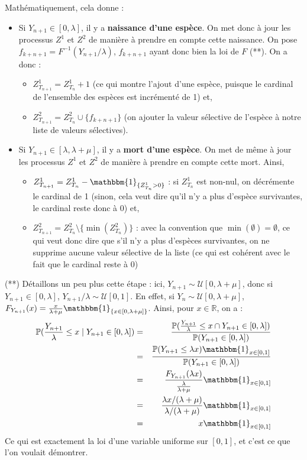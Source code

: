 \documentclass[12pt,a4paper]{article}
\begin{document}
Mathématiquement, cela donne : 
\begin{itemize}
    \item Si $Y_{n+1} \in [0, \lambda]$, il y a \textbf{naissance d'une espèce}. On met donc à jour les processus $Z^1$ et $Z^2$ de manière à prendre en compte cette naissance. On pose $f_{k+n+1} = F^{-1}(Y_{n+1}/\lambda)$, $f_{k+n+1}$ ayant donc bien la loi de $F$ (**). On a donc :
    \begin{itemize}
        \item $Z_{T_{n+1}}^1 = Z_{T_{n}}^1 + 1$ (ce qui montre l'ajout d'une espèce, puisque le cardinal de l'ensemble des espèces est incrémenté de 1) et,
        \item $Z_{{T_{n+1}}}^2 = Z_{T_n}^2 \cup \{f_{k+n+1}\}$ (on ajouter la valeur sélective de l'espèce à notre liste de valeurs sélectives).
    \end{itemize} 
    
    \item Si $Y_{n+1} \in [\lambda, \lambda+\mu]$, il y a \textbf{mort d'une espèce}. On met de même à jour les processus $Z^1$ et $Z^2$ de manière à prendre en compte cette mort. Ainsi, \begin{itemize}
        \item $Z_{T_{n+1}}^1 = Z_{T_n}^1 - \mathbbm{1}_{\{Z_{T_n}^1 > 0 \}}$ : si $Z_{T_n}^1$ est non-nul, on décrémente le cardinal de 1 (sinon, cela veut dire qu'il n'y a plus d'espèce survivantes, le cardinal reste donc à 0) et,
        \item $Z_{T_{n+1}}^2 = Z_{T_n}^2 \setminus \{\min(Z_{T_n}^2)\}$ : avec la convention que $\min (\emptyset ) = \emptyset$, ce qui veut donc dire que s'il n'y a plus d'espèces survivantes, on ne supprime aucune valeur sélective de la liste (ce qui est cohérent avec le fait que le cardinal reste à $0$)
    \end{itemize} 
\end{itemize}

(**) Détaillons un peu plus cette étape : ici, $Y_{n+1} \sim \mathcal{U}[0,\lambda + \mu]$, donc si $Y_{n+1} \in [0, \lambda]$, $Y_{n+1}/\lambda \sim \mathcal{U}[0,1]$.
En effet, si $Y_n \sim \mathcal{U}[0,\lambda+\mu]$, $F_{Y_{n+1}}(x) = \frac{x}{\lambda+\mu} \mathbbm{1}_{\{x \in [0,\lambda + \mu]\}}$. Ainsi, pour $x \in \mathbb{R}$, on a : 
\begin{eqnarray*}
    \mathbb{P}(\frac{Y_{n+1}}{\lambda} \leq x \mid Y_{n+1} \in [0, \lambda]) & = & \frac{\mathbb{P}(\frac{Y_{n+1}}{\lambda} \leq x \cap Y_{n+1} \in [0, \lambda])}{\mathbb{P}(Y_{n+1} \in [0, \lambda])} \\
    & = & \frac{\mathbb{P}(Y_{n+1} \leq \lambda x)\mathbbm{1}_{x\in [0,1]}}{\mathbb{P}(Y_{n+1} \in [0, \lambda])} \\
    & = & \frac{F_{Y_{n+1}}(\lambda x)}{\frac{\lambda}{\lambda+\mu}} \mathbbm{1}_{x\in [0,1]} \\
    & = & \frac{\lambda x / (\lambda + \mu)}{\lambda / (\lambda + \mu)} \mathbbm{1}_{x\in [0,1]} \\
    & = & x \mathbbm{1}_{x\in [0,1]}
\end{eqnarray*}
Ce qui est exactement la loi d'une variable uniforme sur $[0,1]$, et c'est ce que l'on voulait démontrer. \par 
\end{document}
